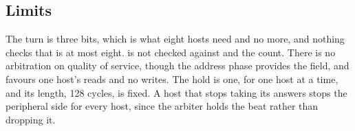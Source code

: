 \subsection*{Limits}

The turn is three bits, which is what eight hosts need and no more,
and nothing checks that  is at most eight.
 is not checked against  and the count. There is no
arbitration on quality of service, though the address phase provides
the field, and  favours one host's reads and no writes.
The hold is one, for one host at a time, and its length, 128 cycles,
is fixed. A host that stops taking its answers stops the peripheral
side for every host, since the arbiter holds the beat rather than
dropping it.
